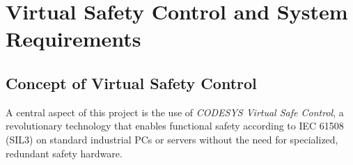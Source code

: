 \documentclass[a4paper,12pt]{article}
\begin{document}



\section{Virtual Safety Control and System Requirements}

\subsection{Concept of Virtual Safety Control}
A central aspect of this project is the use of \textit{CODESYS Virtual Safe Control}, a revolutionary technology that enables functional safety according to IEC 61508 (SIL3) on standard industrial PCs or servers without the need for specialized, redundant safety hardware.
\end{document}
